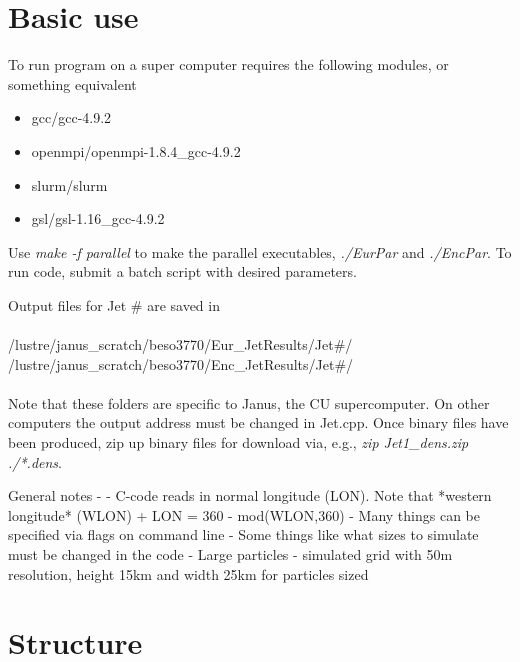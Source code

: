 \documentclass[a4paper,12pt]{article}
\begin{document}
\section{Basic use}
To run program on a super computer requires the following modules, or something equivalent
\begin{itemize}
	\item gcc/gcc-4.9.2
	\item openmpi/openmpi-1.8.4\_gcc-4.9.2
	\item slurm/slurm
	\item gsl/gsl-1.16\_gcc-4.9.2
\end{itemize}
Use \textit{make -f parallel} to make the parallel executables, \textit{./EurPar} and \textit{./EncPar}.
To run code, submit a batch script with desired parameters.


Output files for Jet \# are saved in \\\\
\indent /lustre/janus\_scratch/beso3770/Eur\_JetResults/Jet\#/ \\
\indent /lustre/janus\_scratch/beso3770/Enc\_JetResults/Jet\#/ \\\\
Note that these folders are specific to Janus, the CU supercomputer. On other computers
the output address must be changed in Jet.cpp. Once binary files have been produced, 
zip up binary files for download via, e.g., \textit{zip Jet1\_dens.zip ./*.dens}.


General notes -
	- C-code reads in normal longitude (LON). Note that *western longitude* (WLON)
		+ LON = 360 - mod(WLON,360)
	- Many things can be specified via flags on command line
	- Some things like what sizes to simulate must be changed in the code
	- Large particles - simulated grid with 50m resolution, height 15km and width 25km for particles sized 


\section{Structure}
\end{document}
